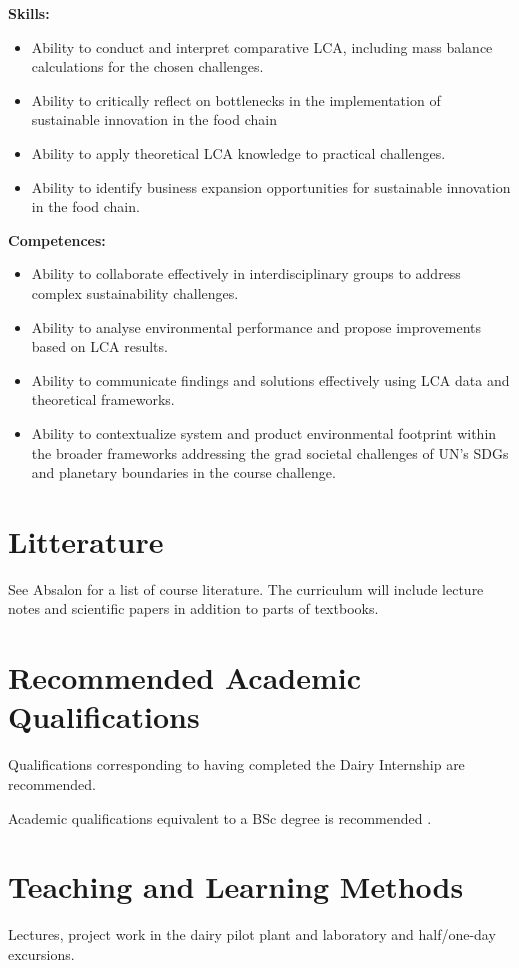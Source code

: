 \textbf{Skills:}
\begin{itemize}
    \item Ability to conduct and interpret comparative LCA, including mass balance calculations for the chosen challenges.
    \item Ability to critically reflect on bottlenecks in the implementation of sustainable innovation in the food chain
    \item Ability to apply theoretical LCA knowledge to practical challenges.
    \item Ability to identify business expansion opportunities for sustainable innovation in the food chain.
\end{itemize}

\textbf{Competences:}
\begin{itemize}
    \item Ability to collaborate effectively in interdisciplinary groups to address complex sustainability challenges.
    \item Ability to analyse environmental performance and propose improvements based on LCA results.
    \item Ability to communicate findings and solutions effectively using LCA data and theoretical frameworks.
    \item Ability to contextualize system and product environmental footprint within the broader frameworks addressing the grad societal challenges of UN's SDGs and planetary boundaries in the course challenge.
\end{itemize}
 




\section*{Litterature}
See Absalon for a list of course literature. The curriculum will include lecture notes and scientific papers in addition to parts of textbooks.

\section*{Recommended Academic Qualifications}
Qualifications corresponding to having completed the Dairy Internship are recommended.

Academic qualifications equivalent to a BSc degree is recommended .


\section*{Teaching and Learning Methods}
Lectures, project work in the dairy pilot plant and laboratory and half/one-day excursions.

